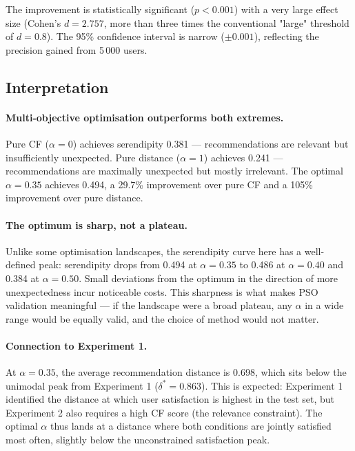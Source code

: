 The improvement is statistically significant ($p < 0.001$) with a very
large effect size (Cohen's $d = 2.757$, more than three times the
conventional "large" threshold of $d = 0.8$).  The 95\% confidence interval
is narrow ($\pm 0.001$), reflecting the precision gained from 5\,000 users.

\subsection{Interpretation}

\paragraph{Multi-objective optimisation outperforms both extremes.}
Pure CF ($\alpha=0$) achieves serendipity 0.381 --- recommendations are
relevant but insufficiently unexpected.  Pure distance ($\alpha=1$) achieves
0.241 --- recommendations are maximally unexpected but mostly irrelevant.
The optimal $\alpha = 0.35$ achieves 0.494, a 29.7\% improvement over pure
CF and a 105\% improvement over pure distance.

\paragraph{The optimum is sharp, not a plateau.}
Unlike some optimisation landscapes, the serendipity curve here has a
well-defined peak: serendipity drops from 0.494 at $\alpha=0.35$ to 0.486
at $\alpha=0.40$ and 0.384 at $\alpha=0.50$.  Small deviations from the
optimum in the direction of more unexpectedness incur noticeable costs.
This sharpness is what makes PSO validation meaningful --- if the landscape
were a broad plateau, any $\alpha$ in a wide range would be equally valid,
and the choice of method would not matter.

\paragraph{Connection to Experiment 1.}
At $\alpha = 0.35$, the average recommendation distance is 0.698, which sits
below the unimodal peak from Experiment 1 ($\delta^* = 0.863$).  This is
expected: Experiment 1 identified the distance at which user satisfaction
is highest in the test set, but Experiment 2 also requires a high CF score
(the relevance constraint).  The optimal $\alpha$ thus lands at a distance
where both conditions are jointly satisfied most often, slightly below the
unconstrained satisfaction peak.

